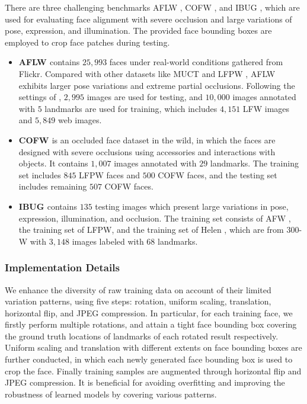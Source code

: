 \documentclass[journal]{IEEEtran}
\begin{document}
There are three challenging benchmarks AFLW \cite{kostinger2011annotated}, COFW \cite{burgos2013robust}, and IBUG \cite{sagonas2013300}, which are used for evaluating face alignment with severe occlusion and large variations of pose, expression, and illumination. The provided face bounding boxes are employed to crop face patches during testing.
\begin{itemize}
\item \textbf{AFLW \cite{kostinger2011annotated}} contains $25,993$ faces under real-world conditions gathered from Flickr. Compared with other datasets like MUCT \cite{milborrow2010muct} and LFPW \cite{belhumeur2013localizing}, AFLW exhibits larger pose variations and extreme partial occlusions. Following the settings of \cite{zhang2014facial,honari2016recombinator}, $2,995$ images are used for testing, and $10,000$ images annotated with $5$ landmarks are used for training, which includes $4,151$ LFW \cite{huang2007labeled} images and $5,849$ web images.

\item \textbf{COFW \cite{burgos2013robust}} is an occluded face dataset in the wild, in which the faces are designed with severe occlusions using accessories and interactions with objects. It contains $1,007$ images annotated with $29$ landmarks. The training set includes $845$ LFPW faces and $500$ COFW faces, and the testing set includes remaining $507$ COFW faces.

\item \textbf{IBUG \cite{sagonas2013300}} contains $135$ testing images which present large variations in pose, expression, illumination, and occlusion. The training set consists of AFW \cite{zhu2012face}, the training set of LFPW, and the training set of Helen \cite{le2012interactive}, which are from 300-W \cite{sagonas2013300} with $3,148$ images labeled with $68$ landmarks.
\end{itemize}

\subsubsection{Implementation Details}
\label{sssec:implementation}

We enhance the diversity of raw training data on account of their limited variation patterns, using five steps: rotation, uniform scaling, translation, horizontal flip, and JPEG compression. In particular, for each training face, we firstly perform multiple rotations, and attain a tight face bounding box covering the ground truth locations of landmarks of each rotated result respectively. Uniform scaling and translation with different extents on face bounding boxes are further conducted, in which each newly generated face bounding box is used to crop the face. Finally training samples are augmented through horizontal flip and JPEG compression. It is beneficial for avoiding overfitting and improving the robustness of learned models by covering various patterns.
\end{document}

